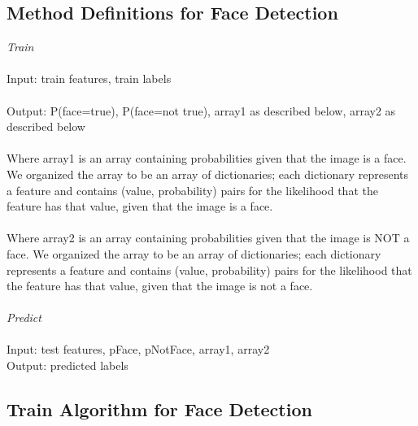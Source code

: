 \documentclass{article}
\begin{document}
\subsection{Method Definitions for Face Detection}
\textit{Train}\\\\
Input: train features, train labels\\\\
Output: P(face=true), P(face=not true), array1 as described below, array2 as described below\\\\
Where array1 is an array containing probabilities given that the image is a face. We organized the array to be an array of dictionaries; each dictionary represents a feature and contains (value, probability) pairs for the likelihood that the feature has that value, given that the image is a face. \\\\
Where array2 is an array containing probabilities given that the image is NOT a face. We organized the array to be an array of dictionaries; each dictionary represents a feature and contains (value, probability) pairs for the likelihood that the feature has that value, given that the image is not a face.\\\\
\textit{Predict} \\\\
Input: test features, pFace, pNotFace, array1, array2\\
Output: predicted labels\\

\subsection{Train Algorithm for Face Detection}
\end{document}
